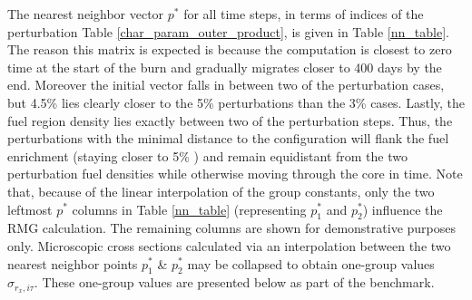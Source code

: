 The nearest neighbor vector $p^*$ for all time steps, in terms of indices
of the perturbation Table \ref{char_param_outer_product}, is given in Table \ref{nn_table}.
The reason this matrix is expected is because the computation is closest to zero time at the start of the 
burn and gradually migrates closer to 400 days by the end.
Moreover the initial  vector falls in between two of the perturbation cases, but 4.5\% lies
clearly closer to the 5\% perturbations than the 3\% cases.
Lastly, the fuel region density lies exactly between two of the perturbation steps.  Thus, the 
perturbations with the minimal distance to the configuration will flank the fuel enrichment 
(staying closer to 5\% ) and remain equidistant from the two perturbation fuel 
densities while otherwise moving through the core in time.  Note that, because of the linear 
interpolation of the group constants, only the two leftmost $p^*$ columns in Table \ref{nn_table}
(representing $p_1^*$ and $p_2^*$) 
influence the RMG calculation.  The remaining columns are shown for demonstrative purposes only.
Microscopic cross sections calculated via an interpolation between the two nearest neighbor points 
$p_1^*$ \& $p_2^*$  may be collapsed to obtain one-group values  $\sigma_{r_x,i\tau}$.  These 
one-group values are presented below as part of the benchmark.



